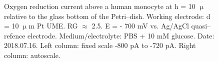 \documentclass[a4paper, 11pt]{article}
\begin{document}
\begin{figure}

\caption{Oxygen reduction current above a human monocyte at h = 10 $\upmu$ relative to the glass bottom of the Petri--dish.
Working electrode: d = 10 $\upmu$m Pt UME. RG $\approx$ 2.5.
E = - 700 mV vs. Ag/AgCl quasi--refence electrode.
Medium/electrolyte: PBS + 10 mM glucose.
Date: 2018.07.16.
Left column: fixed scale -800 pA to -720 pA.
Right column: autoscale.}
\label{fig:results}
\end{figure}
\end{document}
